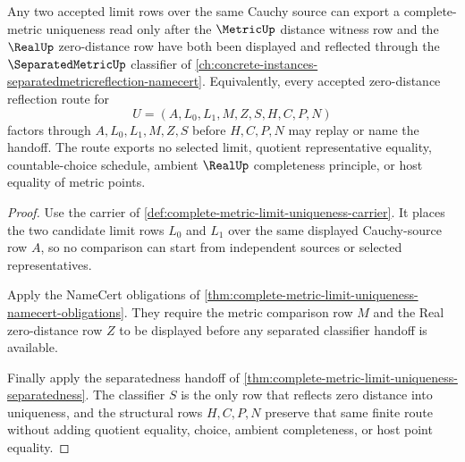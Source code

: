 \begin{theorem}
\label{thm:complete-metric-limit-uniqueness-zero-distance-reflection}
Any two accepted limit rows over the same Cauchy source can export a complete-metric uniqueness read only after the $\MetricUp$ distance witness row and the $\RealUp$ zero-distance row have both been displayed and reflected through the $\SeparatedMetricUp$ classifier of \autoref{ch:concrete-instances-separatedmetricreflection-namecert}. Equivalently, every accepted zero-distance reflection route for
$$
U=(A,L_{0},L_{1},M,Z,S,H,C,P,N)
$$
factors through $A,L_{0},L_{1},M,Z,S$ before $H,C,P,N$ may replay or name the handoff. The route exports no selected limit, quotient representative equality, countable-choice schedule, ambient $\RealUp$ completeness principle, or host equality of metric points.
\end{theorem}
\begin{proof}
Use the carrier of \autoref{def:complete-metric-limit-uniqueness-carrier}. It places the two candidate limit rows $L_{0}$ and $L_{1}$ over the same displayed Cauchy-source row $A$, so no comparison can start from independent sources or selected representatives.

Apply the NameCert obligations of \autoref{thm:complete-metric-limit-uniqueness-namecert-obligations}. They require the metric comparison row $M$ and the Real zero-distance row $Z$ to be displayed before any separated classifier handoff is available.

Finally apply the separatedness handoff of \autoref{thm:complete-metric-limit-uniqueness-separatedness}. The classifier $S$ is the only row that reflects zero distance into uniqueness, and the structural rows $H,C,P,N$ preserve that same finite route without adding quotient equality, choice, ambient completeness, or host point equality.
\end{proof}

